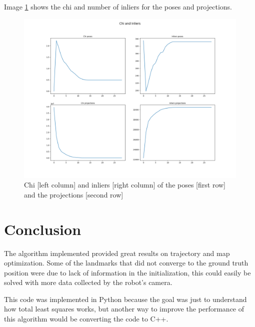 \documentclass{article}
\begin{document}
Image \ref{fig:chi_and_inliers} shows the chi and number of inliers for the poses and projections.

\begin{figure}
  \includegraphics[scale=0.3]{chi_and_inliers.png}
  \centering
  \caption{Chi [left column] and inliers [right column] of the poses [first row] and the projections [second row] }
  \label{fig:chi_and_inliers}
\end{figure}


\section{Conclusion}

The algorithm implemented provided great results on trajectory and map optimization. Some of the landmarks that did not converge to the ground truth position were due to lack of information in the initialization, this could easily be solved with more data collected by the robot's camera.

This code was implemented in Python because the goal was just to understand how total least squares works, but another way to improve the performance of this algorithm would be converting the code to C++.



\clearpage



\end{document}
